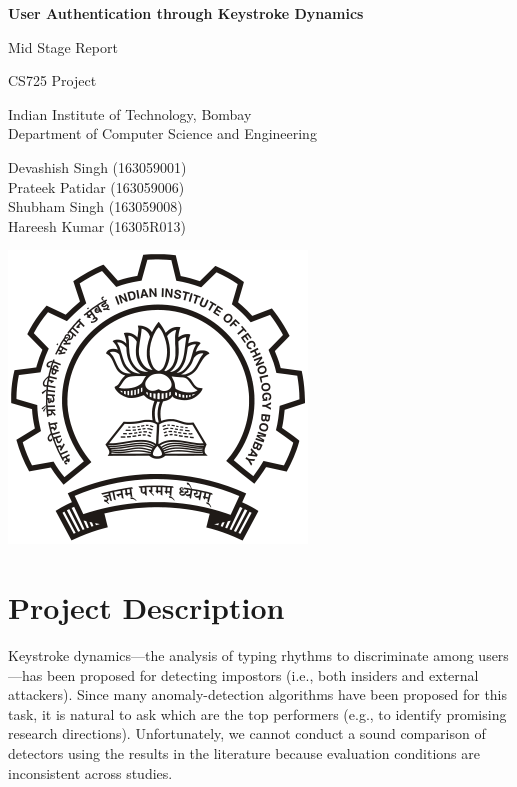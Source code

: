 \documentclass[a4paper,10pt]{article}
\begin{document}
\begin{titlepage}
\begin{center}
\vspace*{1cm}

\huge{\textbf{User Authentication through Keystroke Dynamics}}

\vspace{0.5cm}
Mid Stage Report

\vspace{0.5cm}
CS725 Project

\vspace{3.5cm}
Indian Institute of Technology, Bombay\\
Department of Computer Science and Engineering
\vspace{3.5cm}

\Large{Devashish Singh (163059001) \\ Prateek Patidar (163059006) \\ Shubham Singh (163059008) \\ Hareesh Kumar (16305R013)}

\vfill

\vspace{0.8cm}

\includegraphics[scale=0.35]{IITB.png}
\end{center}
\end{titlepage}
 
\section{Project Description}
Keystroke dynamics—the analysis of typing rhythms to discriminate among users—has been proposed for detecting impostors (i.e., both insiders and external attackers).
Since many anomaly-detection algorithms have been proposed for this task, it is natural to ask which are the top performers (e.g., to identify promising research directions).
Unfortunately, we cannot conduct a sound comparison of detectors using the results in the literature because evaluation conditions are inconsistent across studies.
\end{document}
